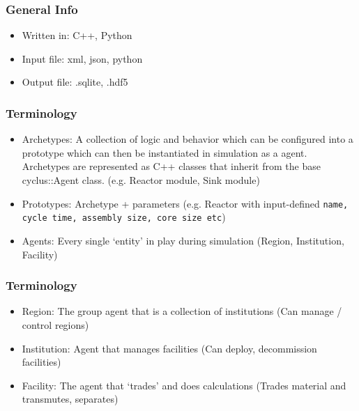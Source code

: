 \begin{frame}
	\frametitle{General Info}
	\begin{itemize}
		\item Written in: C++, Python
		\item Input file: xml, json, python
		\item Output file: .sqlite, .hdf5
	\end{itemize}
\end{frame}


\begin{frame}
	\frametitle{Terminology}
	\begin{itemize}
		\item Archetypes: A collection of logic and behavior which can be configured into a prototype which can then be instantiated in simulation as a agent. Archetypes are represented as C++ classes that inherit from the base cyclus::Agent class. (e.g. Reactor module, Sink module)
		\item Prototypes: Archetype + parameters (e.g. Reactor with input-defined  \texttt{name, cycle time, assembly size, core size etc})
		\item Agents: Every single `entity' in play during simulation (Region, Institution, Facility)
	\end{itemize}
\end{frame}

\begin{frame}
	\frametitle{Terminology}
	\begin{itemize}
		\item Region: The group agent that is a collection of institutions (Can manage / control regions)
		\item Institution: Agent that manages facilities (Can deploy, decommission facilities)
		\item Facility: The agent that `trades' and does calculations (Trades material and transmutes, separates)
	\end{itemize}
\end{frame}

